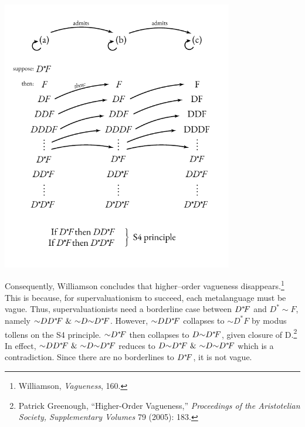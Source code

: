 \begin{center}
\includegraphics[width=3.97674in,height=4.66543in]{papers/figures/2-1.pdf}
\end{center}
Consequently, Williamson concludes that higher--order vagueness
disappears.\footnote{Williamson, \emph{Vagueness}, 160.} This is
because, for supervaluationism to succeed, each metalanguage must be
vague. Thus, supervaluationists need a borderline case between
$D^*\hspace{-0.2em}F$ and $D^*{\sim}F$, namely
${\sim}DD^*\hspace{-0.2em}F \ \& \ {\sim}D{\sim}D^*\hspace{-0.2em}F$. However, ${\sim}DD^*\hspace{-0.2em}F$
collapses to ${{\sim}D}^{*}F$ by modus tollens on the S4 principle. ${\sim}D^*\hspace{-0.2em}F$ then collapses to $D {\sim}D^*\hspace{-0.2em}F$, given closure of
D.\footnote{Patrick Greenough, ``Higher-Order Vagueness,''
  \emph{Proceedings of the Aristotelian Society, Supplementary Volumes}
  79 (2005): 183.}
In effect, ${\sim}DD^*\hspace{-0.2em}F \ \& \ {\sim}D{\sim}D^*\hspace{-0.2em}F$ reduces to $D{\sim}D^*\hspace{-0.2em}F \ \& \ {\sim}D{\sim}D^*\hspace{-0.2em}F$ which is a contradiction.
Since there are no borderlines to $D^*\hspace{-0.2em}F$, it is not vague.

